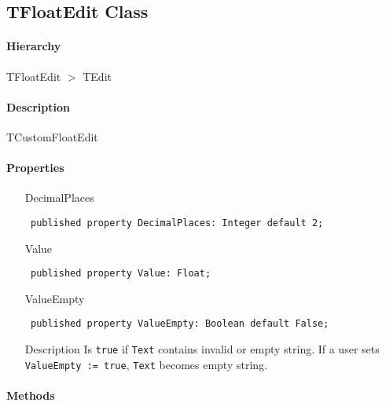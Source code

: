 \documentclass[12pt,a4paper,oneside]{report}
\newcommand{\declarationitem}[1]{{\addfontfeatures{FakeBold=1.3} #1}}
\newcommand{\descriptiontitle}[1]{{\addfontfeatures{FakeSlant}#1}}
\newcommand{\code}[1]{\texttt{#1}}
\begin{document}
\subsection{TFloatEdit Class}
\label{lmnumericedits.TFloatEdit}
\paragraph{Hierarchy}\hspace*{\fill}

TFloatEdit {$>$} TEdit
\paragraph{Description}\hspace*{\fill}

TCustomFloatEdit\paragraph{Properties}\hspace*{\fill}

\begin{itemize}\label{lmnumericedits.TFloatEdit-DecimalPlaces}
\item[\declarationitem{DecimalPlaces}\hfill]
\begin{flushleft}
\code{
published property DecimalPlaces: Integer default 2;}
\end{flushleft}
\label{lmnumericedits.TFloatEdit-Value}
\item[\declarationitem{Value}\hfill]
\begin{flushleft}
\code{
published property Value: Float;}
\end{flushleft}
\label{lmnumericedits.TFloatEdit-ValueEmpty}
\item[\declarationitem{ValueEmpty}\hfill]
\begin{flushleft}
\code{
published property ValueEmpty: Boolean default False;}
\end{flushleft}
\item[\descriptiontitle{Description}]
Is \code{true} if \code{Text} contains invalid or empty string. If a user sets \code{ValueEmpty := true}, \code{Text} becomes empty string.
\end{itemize}
\paragraph{Methods}\hspace*{\fill}
\end{document}
